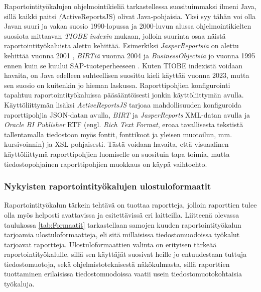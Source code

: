 Raportointityökalujen ohjelmointikieliä tarkastellessa suosituimmaksi ilmeni Java, sillä kaikki paitsi \textit(ActiveReportsJS) olivat Java-pohjaisia. Yksi syy tähän voi olla Javan suuri ja vakaa suosio 1990-lopussa ja 2000-luvun alussa ohjelmointikielten suosiota mittaavan \textit{TIOBE indexin} mukaan\cite{noauthor_tiobe_nodate}, jolloin suurinta osaa näistä raportointityökaluista alettu kehittää. Esimerkiksi \textit{JasperReportsia} on alettu kehittää vuonna 2001 \cite{noauthor_origin_2006}, \textit{BIRTiä} vuonna 2004 \cite{noauthor_eclipse_2004} ja \textit{BusinessObjectsia} jo vuonna 1995 ennen kuin se kuului SAP-tuoteperheeseen \cite{alma9922048891805971}. Kuten {TIOBE indexistä} voidaan havaita, on Java edelleen suhteellisen suosittu kieli käyttää vuonna 2023, mutta sen suosio on kuitenkin jo hieman laskussa. Raporttipohjien konfigurointi tapahtuu raportointityökaluissa pääsääntöisesti jonkin käyttöliittymän avulla. Käyttöliittymän lisäksi \textit{ActiveReportsJS} tarjoaa mahdollisuuden konfiguroida raporttipohjia JSON-datan avulla, \textit{BIRT} ja  \textit{JasperReports} XML-datan avulla ja \textit{Oracle BI Publisher} RTF (engl. \textit{Rich Text Format}, eroaa tavallisesta tekstistä tallentamalla tiedostoon myös fontit, fonttikoot ja yleisen muotoilun, mm. kursivoinnin) ja XSL-pohjaisesti. Tästä voidaan havaita, että visuaalinen käyttöliittymä raporttipohjien luomiselle on suosituin tapa toimia, mutta tiedostopohjainen raporttipohjien muokkaus on käypä vaihtoehto.

\subsubsection{Nykyisten raportointityökalujen ulostuloformaatit}

Raportointityökalun tärkein tehtävä on tuottaa raportteja, jolloin raporttien tulee olla myös helposti avattavissa ja esitettävissä eri laitteilla. Liitteenä olevassa taulukossa \ref{tab:Formaatit} tarkastellaan samojen kuuden raportointityökalun tarjoamia ulostuloformaatteja, eli sitä millaisissa tiedostomuodoissa työkalut tarjoavat raportteja. Ulostuloformaattien valinta on erityisen tärkeää raportointityökalulle, sillä sen käyttäjät suosivat heille jo entuudestaan tuttuja tiedostomuotoja, sekä ohjelmistoteknisestä näkökulmasta, sillä raporttien tuottaminen erilaisissa tiedostomuodoissa vaatii usein tiedostomuotokohtaisia työkaluja.

